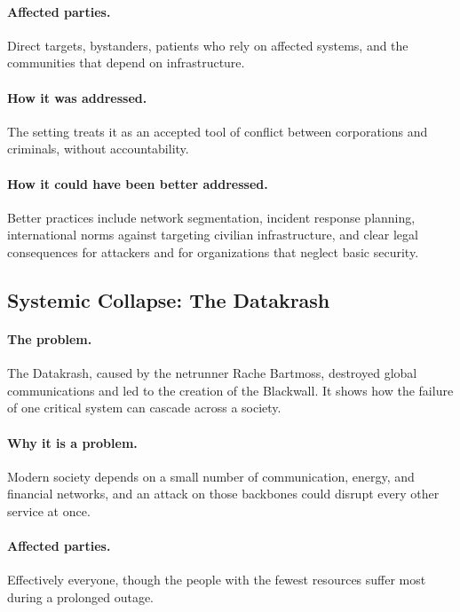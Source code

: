 \documentclass{article}%
\begin{document}
\paragraph{Affected parties.}
Direct targets, bystanders, patients who rely on affected systems, and the communities that depend on infrastructure.

\paragraph{How it was addressed.}
The setting treats it as an accepted tool of conflict between corporations and criminals, without accountability.

\paragraph{How it could have been better addressed.}
Better practices include network segmentation, incident response planning, international norms against targeting civilian infrastructure, and clear legal consequences for attackers and for organizations that neglect basic security.

\subsection{Systemic Collapse: The Datakrash}

\paragraph{The problem.}
The Datakrash, caused by the netrunner Rache Bartmoss, destroyed global communications and led to the creation of the Blackwall. It shows how the failure of one critical system can cascade across a society.

\paragraph{Why it is a problem.}
Modern society depends on a small number of communication, energy, and financial networks, and an attack on those backbones could disrupt every other service at once.

\paragraph{Affected parties.}
Effectively everyone, though the people with the fewest resources suffer most during a prolonged outage.
\end{document}
